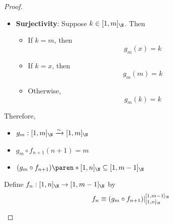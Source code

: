 \begin{proof}
\begin{enumerate}[label=\textbf{(\Alph*)}]
\begin{itemize}
\begin{itemize}
\begin{itemize}
\begin{itemize}
\[\begin{array}{c}
                                              \Downarrow                                                   \\
                                              g_{m}(y_{2}) = y_{1}                                         \\
                                              \by{\ensuremath{y_{1} \neq m \land y_{1} \neq x}} \Downarrow \\
                                              g_{m}(y_{2}) = y_{2} = y_{1}
                                            \end{array}
                                          \]
                                  \end{itemize}
                            \item \textbf{Surjectivity}: Suppose $k \in [1, m]_{\N}$. Then
                                  \begin{itemize}
                                    \item If $k = m$, then
                                          \[
                                            g_{m}(x) = k
                                          \]
                                    \item If $k = x$, then
                                          \[
                                            g_{m}(m) = k
                                          \]
                                    \item Otherwise,
                                          \[
                                            g_{m}(k) = k
                                          \]
                                  \end{itemize}
                          \end{itemize}
                          Therefore,
                          \begin{itemize}
                            \item $g_{m}: [1, m]_{\N} \xrightarrow{\sim} [1, m]_{\N}$
                            \item $g_{m} \circ f_{n + 1}(n + 1) = m$
                            \item $(g_{m} \circ f_{n + 1})\paren*{[1, n]_{\N}} \subseteq [1, m - 1]_{\N}$
                          \end{itemize}
                          Define $f_{n}: [1, n]_{\N} \to [1, m - 1]_{\N}$ by
                          \[
                            f_{n} \equiv (g_{m} \circ f_{n + 1})|_{[1, n]_{\N}}^{[1, m - 1]_{\N}}
\]
\end{itemize}
\end{itemize}
\end{enumerate}
\end{proof}
